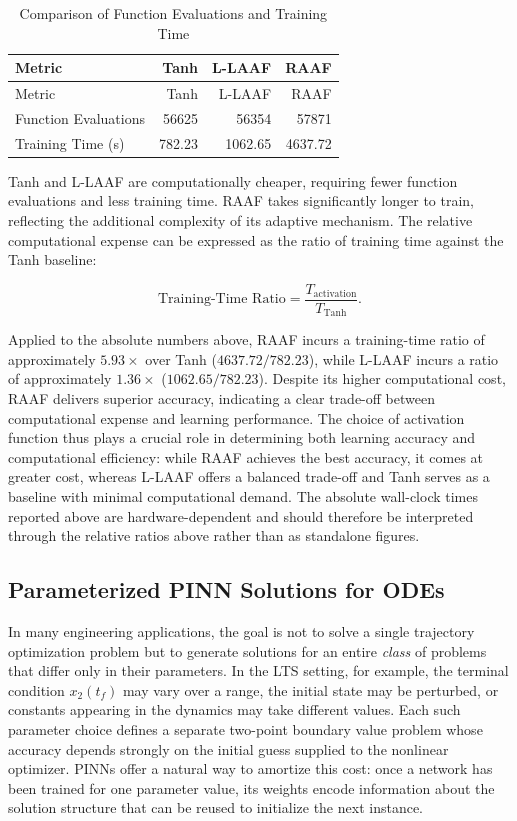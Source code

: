 \documentclass[
  number,
  preprint]{elsarticle}
\begin{document}
\begin{longtable}[]{@{}lrrr@{}}
\caption{Comparison of Function Evaluations and Training
Time}\label{tbl-ch3-fe-time}\tabularnewline
\toprule\noalign{}
Metric & Tanh & L-LAAF & RAAF \\
\midrule\noalign{}
\endfirsthead
\toprule\noalign{}
Metric & Tanh & L-LAAF & RAAF \\
\midrule\noalign{}
\endhead
\bottomrule\noalign{}
\endlastfoot
Function Evaluations & 56625 & 56354 & 57871 \\
Training Time (s) & 782.23 & 1062.65 & 4637.72 \\
\end{longtable}

Tanh and L-LAAF are computationally cheaper, requiring fewer function
evaluations and less training time. RAAF takes significantly longer to
train, reflecting the additional complexity of its adaptive mechanism.
The relative computational expense can be expressed as the ratio of
training time against the Tanh baseline:

\[
\text{Training-Time Ratio}
=
\frac{T_{\text{activation}}}{T_{\text{Tanh}}}.
\]

Applied to the absolute numbers above, RAAF incurs a training-time ratio
of approximately \(5.93\times\) over Tanh (\(4637.72/782.23\)), while
L-LAAF incurs a ratio of approximately \(1.36\times\)
(\(1062.65/782.23\)). Despite its higher computational cost, RAAF
delivers superior accuracy, indicating a clear trade-off between
computational expense and learning performance. The choice of activation
function thus plays a crucial role in determining both learning accuracy
and computational efficiency: while RAAF achieves the best accuracy, it
comes at greater cost, whereas L-LAAF offers a balanced trade-off and
Tanh serves as a baseline with minimal computational demand. The
absolute wall-clock times reported above are hardware-dependent and
should therefore be interpreted through the relative ratios above rather
than as standalone figures.

\subsection{Parameterized PINN Solutions for
ODEs}\label{parameterized-pinn-solutions-for-odes}

In many engineering applications, the goal is not to solve a single
trajectory optimization problem but to generate solutions for an entire
\emph{class} of problems that differ only in their parameters. In the
LTS setting, for example, the terminal condition \(x_2(t_f)\) may vary
over a range, the initial state may be perturbed, or constants appearing
in the dynamics may take different values. Each such parameter choice
defines a separate two-point boundary value problem whose accuracy
depends strongly on the initial guess supplied to the nonlinear
optimizer. PINNs offer a natural way to amortize this cost: once a
network has been trained for one parameter value, its weights encode
information about the solution structure that can be reused to
initialize the next instance.
\end{document}
